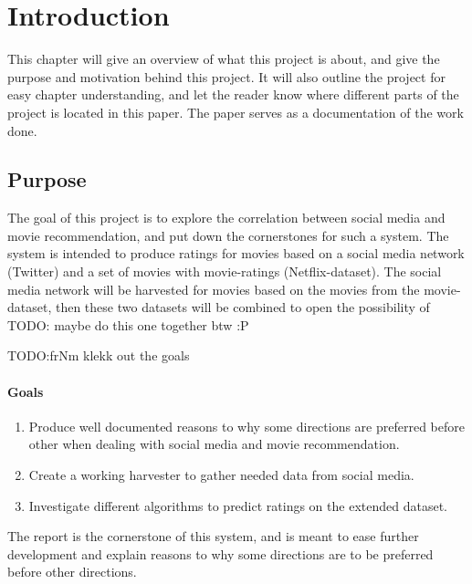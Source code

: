 
\chapter{Introduction}

\minitoc
\setcounter{page}{1}

This chapter will give an overview of what this project is about, and give the purpose and motivation behind this project. It will also outline the project for easy chapter understanding, and let the reader know where different parts of the project is located in this paper. The paper serves as a documentation of the work done.

\clearpage


\section{Purpose}
The goal of this project is to explore the correlation between social media and movie recommendation, and put down the cornerstones for such a system. The system is intended to produce ratings for movies based on a social media network (Twitter) and a set of movies with movie-ratings (Netflix-dataset). The social media network will be harvested for movies based on the movies from the movie-dataset, then these two datasets will be combined to open the possibility of TODO: maybe do this one together btw :P

TODO:frNm klekk out the goals
\subsubsection{Goals}
\begin{enumerate}
  \item Produce well documented reasons to why some directions are preferred before other when dealing with social media and movie recommendation.
  \item Create a working harvester to gather needed data from social media.
  \item Investigate different algorithms to predict ratings on the extended dataset.
\end{enumerate}

The report is the cornerstone of this system, and is meant to ease further development and explain reasons to why some directions are to be preferred before other directions.


